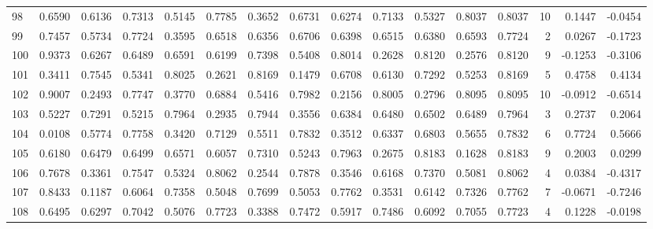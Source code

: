 \begin{tabular}{lrrrrrrrrrrrrrrr}
98  &      0.6590 &  0.6136 &  0.7313 &  0.5145 &  0.7785 &  0.3652 &  0.6731 &  0.6274 &  0.7133 &  0.5327 &   0.8037 &     0.8037 &     10 &                    0.1447 &                    -0.0454 \\
99  &      0.7457 &  0.5734 &  0.7724 &  0.3595 &  0.6518 &  0.6356 &  0.6706 &  0.6398 &  0.6515 &  0.6380 &   0.6593 &     0.7724 &      2 &                    0.0267 &                    -0.1723 \\
100 &      0.9373 &  0.6267 &  0.6489 &  0.6591 &  0.6199 &  0.7398 &  0.5408 &  0.8014 &  0.2628 &  0.8120 &   0.2576 &     0.8120 &      9 &                   -0.1253 &                    -0.3106 \\
101 &      0.3411 &  0.7545 &  0.5341 &  0.8025 &  0.2621 &  0.8169 &  0.1479 &  0.6708 &  0.6130 &  0.7292 &   0.5253 &     0.8169 &      5 &                    0.4758 &                     0.4134 \\
102 &      0.9007 &  0.2493 &  0.7747 &  0.3770 &  0.6884 &  0.5416 &  0.7982 &  0.2156 &  0.8005 &  0.2796 &   0.8095 &     0.8095 &     10 &                   -0.0912 &                    -0.6514 \\
103 &      0.5227 &  0.7291 &  0.5215 &  0.7964 &  0.2935 &  0.7944 &  0.3556 &  0.6384 &  0.6480 &  0.6502 &   0.6489 &     0.7964 &      3 &                    0.2737 &                     0.2064 \\
104 &      0.0108 &  0.5774 &  0.7758 &  0.3420 &  0.7129 &  0.5511 &  0.7832 &  0.3512 &  0.6337 &  0.6803 &   0.5655 &     0.7832 &      6 &                    0.7724 &                     0.5666 \\
105 &      0.6180 &  0.6479 &  0.6499 &  0.6571 &  0.6057 &  0.7310 &  0.5243 &  0.7963 &  0.2675 &  0.8183 &   0.1628 &     0.8183 &      9 &                    0.2003 &                     0.0299 \\
106 &      0.7678 &  0.3361 &  0.7547 &  0.5324 &  0.8062 &  0.2544 &  0.7878 &  0.3546 &  0.6168 &  0.7370 &   0.5081 &     0.8062 &      4 &                    0.0384 &                    -0.4317 \\
107 &      0.8433 &  0.1187 &  0.6064 &  0.7358 &  0.5048 &  0.7699 &  0.5053 &  0.7762 &  0.3531 &  0.6142 &   0.7326 &     0.7762 &      7 &                   -0.0671 &                    -0.7246 \\
108 &      0.6495 &  0.6297 &  0.7042 &  0.5076 &  0.7723 &  0.3388 &  0.7472 &  0.5917 &  0.7486 &  0.6092 &   0.7055 &     0.7723 &      4 &                    0.1228 &                    -0.0198 \\

\end{tabular}
